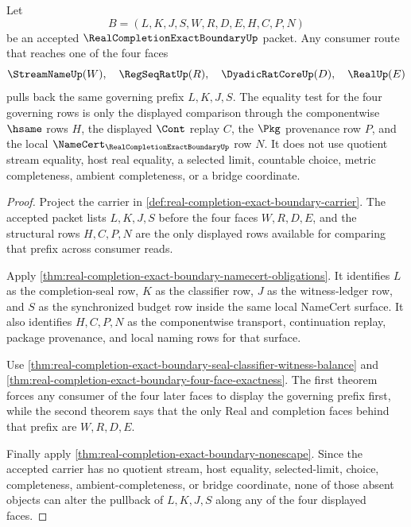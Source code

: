\begin{theorem}
\label{thm:real-completion-exact-boundary-seal-budget-prefix-pullback}
Let
$$
B=(L,K,J,S,W,R,D,E,H,C,P,N)
$$
be an accepted $\RealCompletionExactBoundaryUp$ packet. Any consumer route that reaches one of the four faces
$$
\StreamNameUp(W),\quad \RegSeqRatUp(R),\quad \DyadicRatCoreUp(D),\quad \RealUp(E)
$$
pulls back the same governing prefix $L,K,J,S$. The equality test for the four governing rows is only the displayed comparison through the componentwise $\hsame$ rows $H$, the displayed $\Cont$ replay $C$, the $\Pkg$ provenance row $P$, and the local $\NameCert_{\RealCompletionExactBoundaryUp}$ row $N$. It does not use quotient stream equality, host real equality, a selected limit, countable choice, metric completeness, ambient completeness, or a bridge coordinate.
\end{theorem}
\begin{proof}
Project the carrier in \autoref{def:real-completion-exact-boundary-carrier}. The accepted packet lists $L,K,J,S$ before the four faces $W,R,D,E$, and the structural rows $H,C,P,N$ are the only displayed rows available for comparing that prefix across consumer reads.

Apply \autoref{thm:real-completion-exact-boundary-namecert-obligations}. It identifies $L$ as the completion-seal row, $K$ as the classifier row, $J$ as the witness-ledger row, and $S$ as the synchronized budget row inside the same local NameCert surface. It also identifies $H,C,P,N$ as the componentwise transport, continuation replay, package provenance, and local naming rows for that surface.

Use \autoref{thm:real-completion-exact-boundary-seal-classifier-witness-balance} and \autoref{thm:real-completion-exact-boundary-four-face-exactness}. The first theorem forces any consumer of the four later faces to display the governing prefix first, while the second theorem says that the only Real and completion faces behind that prefix are $W,R,D,E$.

Finally apply \autoref{thm:real-completion-exact-boundary-nonescape}. Since the accepted carrier has no quotient stream, host equality, selected-limit, choice, completeness, ambient-completeness, or bridge coordinate, none of those absent objects can alter the pullback of $L,K,J,S$ along any of the four displayed faces.
\end{proof}

